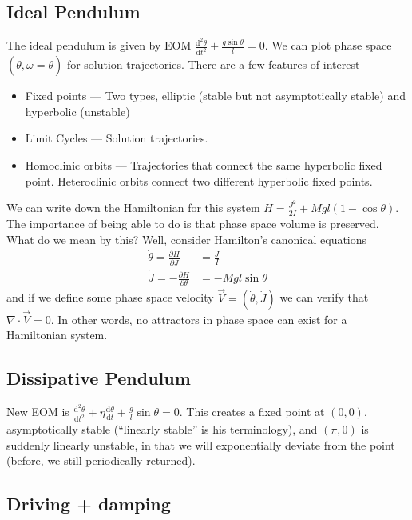 \documentclass[10pt]{article}
\newcommand{\rd}[2]{\frac{\mathrm{d}#1}{\mathrm{d}#2}}
\newcommand{\pd}[2]{\frac{\partial#1}{\partial#2}}
\newcommand{\rtd}[2]{\frac{\mathrm{d}^2#1}{\mathrm{d}#2^2}}
\begin{document}
\subsection{Ideal Pendulum}

The ideal pendulum is given by EOM $\rtd{\theta}{t} + \frac{g\sin\theta}{l} =
0$. We can plot phase space $(\theta, \omega = \dot{\theta})$ for solution
trajectories. There are a few features of interest
\begin{itemize}
    \item Fixed points --- Two types, elliptic (stable but not asymptotically
        stable) and hyperbolic (unstable)
    \item Limit Cycles --- Solution trajectories.
    \item Homoclinic orbits --- Trajectories that connect the same hyperbolic
        fixed point. Heteroclinic orbits connect two different hyperbolic fixed
        points.
\end{itemize}

We can write down the Hamiltonian for this system $H = \frac{J^2}{2I} +
Mgl(1-\cos\theta)$. The importance of being able to do is that phase space
volume is preserved. What do we mean by this? Well, consider Hamilton's
canonical equations
\begin{align}
    \dot{\theta} = \pd{H}{J} &= \frac{J}{I} \nonumber\\
    \dot{J} = -\pd{H}{\theta} &= -Mgl\sin\theta
\end{align}
and if we define some phase space velocity $\vec{V} = \left( \dot{\theta},
\dot{J} \right)$ we can verify that $\nabla \cdot \vec{V} = 0$. In other words,
no attractors in phase space can exist for a Hamiltonian system.

\subsection{Dissipative Pendulum}

New EOM is $\rtd{\theta}{t} + \eta \rd{\theta}{t} + \frac{g}{l}\sin\theta = 0$.
This creates a fixed point at $(0,0)$, asymptotically stable (``linearly
stable'' is his terminology), and $(\pi,0)$ is suddenly linearly unstable, in
that we will exponentially deviate from the point (before, we still
periodically returned).

\subsection{Driving + damping}
\end{document}
